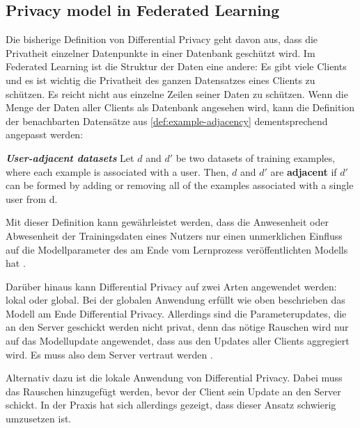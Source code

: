 \subsection{Privacy model in Federated Learning}
Die bisherige Definition von Differential Privacy geht davon aus, dass die Privatheit einzelner Datenpunkte in einer Datenbank geschützt wird. Im Federated Learning ist die Struktur der Daten eine andere: Es gibt viele Clients und es ist wichtig die Privatheit des ganzen Datensatzes eines Clients zu schützen. Es reicht nicht aus einzelne Zeilen seiner Daten zu schützen. Wenn die Menge der Daten aller Clients als Datenbank angesehen wird, kann die Definition der benachbarten Datensätze aus  \autoref{def:example-adjacency} dementsprechend angepasst werden:

\begin{definition}\label{def:user-adjacency}
	\emph{\textbf{User-adjacent datasets}\cite{mcmahan:2018}} Let $d$ and $d'$ be two datasets of training examples, where each example is associated with a user. Then, $d$ and $d'$ are \textbf{adjacent} if $d'$ can be formed by adding or removing all of the examples associated with a single user from d.
\end{definition}

Mit dieser Definition kann gewährleistet werden, dass die Anwesenheit oder Abwesenheit der Trainingsdaten eines Nutzers nur einen unmerklichen Einfluss auf die Modellparameter des am Ende vom Lernprozess veröffentlichten Modells hat \cite{mcmahan:2018}.

Darüber hinaus kann Differential Privacy auf zwei Arten angewendet werden: lokal oder global. Bei der globalen Anwendung erfüllt wie oben beschrieben das Modell am Ende Differential Privacy. Allerdings sind die Parameterupdates, die an den Server geschickt werden nicht privat, denn das nötige Rauschen wird nur auf das Modellupdate angewendet, dass aus den Updates aller Clients aggregiert wird. Es muss also dem Server vertraut werden \cite[p.44]{kairouz:2021}.

Alternativ dazu ist die lokale Anwendung von Differential Privacy. Dabei muss das Rauschen hinzugefügt werden, bevor der Client sein Update an den Server schickt. In der Praxis hat sich allerdings gezeigt, dass dieser Ansatz schwierig umzusetzen ist\cite[p.54]{kairouz:2021}.